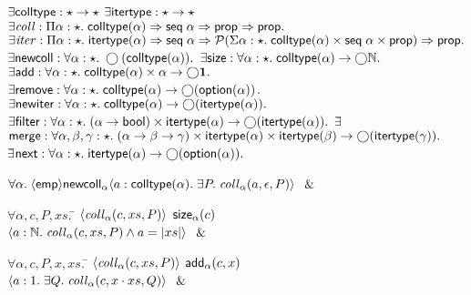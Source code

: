 \begin{figure}
\mbox{}
\begin{specification}
$\exists \mathsf{colltype} : \star \to \star$  
$\exists \mathsf{itertype} : \star \to \star$  
$\exists \mathit{coll} : 
        \Pi \alpha:\star.\; \mathsf{colltype}(\alpha) \Rightarrow \mathsf{seq}\;{\alpha} \Rightarrow \mathsf{prop} \Rightarrow \mathsf{prop}.$ 
$\exists \mathit{iter} : 
        \Pi \alpha:\star.\; \mathsf{itertype}(\alpha) \Rightarrow \mathsf{seq}\;{\alpha} \Rightarrow \mathcal{P}(\Sigma \alpha:\star.\; \mathsf{colltype}(\alpha) \times \mathsf{seq}\;{\alpha} \times \mathsf{prop}) \Rightarrow \mathsf{prop}.$ 
$\exists \mathsf{newcoll} : 
         \forall \alpha:\star.\; \bigcirc{(\mathsf{colltype}(\alpha))}.$
 $\exists \mathsf{size} : 
         \forall \alpha:\star.\; \mathsf{colltype}(\alpha) \to \bigcirc{\mathbb{N}}.$ 
 $\exists \mathsf{add} : 
         \forall \alpha:\star.\; \mathsf{colltype}(\alpha) \times \alpha \to \bigcirc{\mathbf{1}}.$
 $\exists \mathsf{remove} :
         \forall \alpha:\star.\; \mathsf{colltype}(\alpha) \to \bigcirc{(\mathsf{option }{(\alpha)})}$. 
 $\exists \mathsf{newiter} : 
         \forall \alpha:\star.\; \mathsf{colltype}(\alpha) \to \bigcirc{(\mathsf{itertype}(\alpha))}.$ 
 $\exists \mathsf{filter} : 
         \forall \alpha:\star.\; (\alpha \to \mathsf{bool}) \times \mathsf{itertype}(\alpha) 
                                 \to \bigcirc{(\mathsf{itertype}(\alpha))}.$ 
$\exists$\=$ \mathsf{merge} : 
         \forall \alpha,\beta,\gamma:\star.\; (\alpha \to \beta \to \gamma) \times
                                 \mathsf{itertype}(\alpha) \times \mathsf{itertype}(\beta) 
                                   \to \bigcirc{(\mathsf{itertype}(\gamma))}.$
$\exists$\=$\mathsf{next} : 
         \forall \alpha:\star.\; \mathsf{itertype}(\alpha) \to \bigcirc{(\mathsf{option }{(\alpha)})}.$  

\> $\forall \alpha.\; \langle{\mathsf{emp}}\rangle{{\mathsf{newcoll}_\alpha}}\langle{a:\mathsf{colltype}(\alpha)}.\;{\exists P.\; \mathit{coll}_\alpha(a, \epsilon,P)}\rangle$ $\;\&\;$ 

\> $\forall \alpha, c, P, xs.\;$\=
         $\left<{\mathit{coll}_\alpha(c, xs, P)}\right>$
\nextline
\> \>  ${\mathsf{size}_\alpha(c)}$ 
\nextline
\> \>  $\left<{a:\mathbb{N}.\; \mathit{coll}_\alpha(c, xs, P) \land a = |xs|}\right>$  $\;\&\;$ 

 \> $\forall \alpha, c, P, x, xs.\;$\=
               $\left<{\mathit{coll}_\alpha(c, xs, P)}\right>$ 
\nextline
\>\>         ${\mathsf{add}_\alpha(c, x)}$
\nextline
\>\>         $\left<{a:1.\; \exists Q.\; \mathit{coll}_\alpha(c, x\cdot xs, Q)}\right>$ $\;\&\;$ 


\end{specification}
\end{figure}
